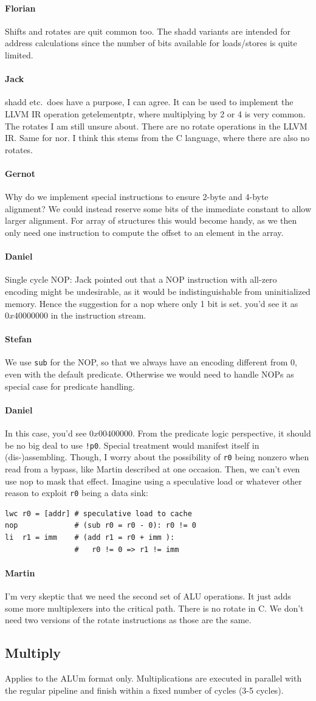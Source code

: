 \documentclass{IEEEtran}
\newcommand{\comment}[3]{\paragraph*{\textbf{#1}}{\color{#3}#2}}
\newcommand{\martin}[1]{\comment{Martin}{#1}{Blue}}
\newcommand{\stefan}[1]{\comment{Stefan}{#1}{RoyalPurple}}
\newcommand{\daniel}[1]{\comment{Daniel}{#1}{RoyalBlue}}
\newcommand{\gebhard}[1]{\comment{Gernot}{#1}{RedOrange}}
\newcommand{\fb}[1]{\comment{Florian}{#1}{Emerald}}
\newcommand{\jack}[1]{\comment{Jack}{#1}{Magenta}}
\begin{document}
\fb{Shifts and rotates are quit common too. The shadd variants are intended for
address calculations since the number of bits available for loads/stores is
quite limited.}

\jack{shadd etc.~does have a purpose, I can agree. It can be used to
implement the LLVM IR operation getelementptr, where multiplying by 2 or
4 is very common.  The rotates I am still unsure about. There are no
rotate operations in the LLVM IR. Same for nor. I think this stems from the
C language, where there are also no rotates.}

\gebhard{Why do we implement special instructions to ensure 2-byte and 4-byte alignment?
We could instead reserve some bits of the immediate constant to allow larger alignment.
For array of structures this would become handy, as we then only need one instruction to compute the offset to an element in the array.}

\daniel{Single cycle NOP: Jack pointed out that a NOP instruction with all-zero
encoding might be undesirable, as it would be indistinguishable from uninitialized memory.
Hence the suggestion for a nop where only 1 bit is set. you'd see it as $0x40000000$
in the instruction stream.}

\stefan{We use \texttt{sub} for the NOP, so that we always have an encoding different from 0, even with the default predicate.
Otherwise we would need to handle NOPs as special case for predicate handling.}

\daniel{In this case, you'd see $0x00400000$.
From the predicate logic perspective, it should be no big deal to use \texttt{!p0}.
Special treatment would manifest itself in (dis-)assembling.
Though, I worry about the possibility of \texttt{r0} being nonzero when read from a bypass,
like Martin described at one occasion. Then, we can't even use nop to mask that effect.
Imagine using a speculative load or whatever other reason to exploit \texttt{r0} being a data sink:
}
\begin{verbatim}
lwc r0 = [addr] # speculative load to cache
nop             # (sub r0 = r0 - 0): r0 != 0
li  r1 = imm    # (add r1 = r0 + imm ):
                #   r0 != 0 => r1 != imm
\end{verbatim}

\martin{I'm very skeptic that we need the second set of ALU
operations. It just adds some more multiplexers into the
critical path. There is no rotate in C. We don't need two
versions of the rotate instructions as those are the same.}


\subsection{Multiply} Applies to the ALUm format only. Multiplications are
executed in parallel with the regular pipeline and finish within a fixed number
of cycles (3-5 cycles).
\end{document}
